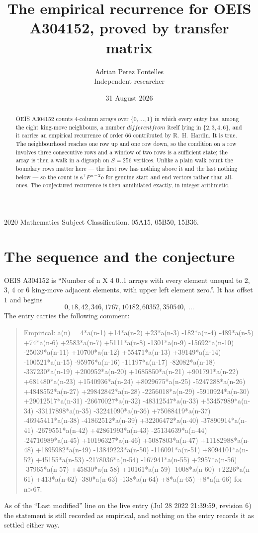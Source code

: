 \documentclass[11pt,a4paper]{article}
\title{The empirical recurrence for OEIS A304152, proved by transfer matrix}
\author{Adrian Perez Fontelles\\ \small Independent researcher}
\date{31 August 2026}
\theoremstyle{plain}
\theoremstyle{definition}
\begin{document}
\maketitle

\begin{abstract}
OEIS A304152 counts $4$-column arrays over $\{0,\dots,1\}$ in which every entry has,
among the eight king-move neighbours, a number $different from$ itself lying in $\{2,3,4,6\}$, and it carries an empirical
recurrence of order $66$ contributed by R.~H.~Hardin. It is true. The neighbourhood
reaches one row up and one row down, so the condition on a row involves three consecutive
rows and a window of two rows is a sufficient state; the array is then a walk in a digraph
on $S=256$ vertices. Unlike a plain walk count the boundary rows matter here --- the first
row has nothing above it and the last nothing below --- so the count is
$\mathbf{s}^{\!\top}P^{\,n-2}\mathbf{e}$ for genuine start and end vectors rather than
all-ones. The conjectured recurrence is then annihilated exactly, in integer arithmetic.
\end{abstract}

\noindent\small 2020 Mathematics Subject Classification. 05A15, 05B50, 15B36.\normalsize

\section{The sequence and the conjecture}

OEIS A304152 is ``Number of n X 4 0..1 arrays with every element unequal to 2, 3, 4 or 6 king-move adjacent elements, with upper left element zero.''. It has offset
$1$ and begins
\[
0, 18, 42, 346, 1767, 10182, 60352, 350540,\ \dots
\]
The entry carries the following comment:
\begin{quote}\small
Empirical: a(n) = 4*a(n-1) +14*a(n-2) +23*a(n-3) -182*a(n-4) -489*a(n-5) +74*a(n-6) +2583*a(n-7) +5111*a(n-8) -1301*a(n-9) -15692*a(n-10) -25039*a(n-11) +10700*a(n-12) +55471*a(n-13) +39149*a(n-14) -100521*a(n-15) -95976*a(n-16) -11197*a(n-17) -82082*a(n-18) -337230*a(n-19) +200952*a(n-20) +1685850*a(n-21) +901791*a(n-22) +681480*a(n-23) +1540936*a(n-24) +8029675*a(n-25) -5247288*a(n-26) +4848552*a(n-27) +29842842*a(n-28) -2256018*a(n-29) -5910924*a(n-30) +29012517*a(n-31) -26670027*a(n-32) -48312547*a(n-33) +53457989*a(n-34) -33117898*a(n-35) -32241090*a(n-36) +75088419*a(n-37) -46945411*a(n-38) -41862512*a(n-39) +32206472*a(n-40) -37890914*a(n-41) -2679551*a(n-42) +42861993*a(n-43) -25134639*a(n-44) -24710989*a(n-45) +10196327*a(n-46) +5087803*a(n-47) +11182988*a(n-48) +1895982*a(n-49) -13849223*a(n-50) -116091*a(n-51) +8094101*a(n-52) +45155*a(n-53) -2178036*a(n-54) -167941*a(n-55) +2957*a(n-56) -37965*a(n-57) +45830*a(n-58) +10161*a(n-59) -1008*a(n-60) +2226*a(n-61) +413*a(n-62) -380*a(n-63) -138*a(n-64) +8*a(n-65) +8*a(n-66) for n>67.
\end{quote}
As of the ``Last modified'' line on the live entry (Jul 28 2022 21:39:59, revision
6) the statement is still recorded as empirical, and nothing on the entry
records it as settled either way.
\end{document}
